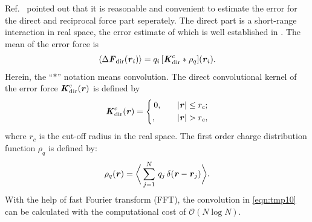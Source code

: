 \documentclass[aps,pre,preprint]{revtex4-1}
\renewcommand{\v}[1]{\textbf{\textit{#1}}}
\begin{document}
Ref.~\cite{wang2010optimizing} pointed out that it
is reasonable and convenient to estimate the error for the direct and
reciprocal force part seperately. 
The direct part is a short-range
interaction in real space, the error estimate of which
is well established in \cite{short}.
The mean of the error force is
\begin{align}\label{eqn:tmp10}
  \langle\Delta\v F_{\textrm{dir}}(\v r_i)\rangle
  =q_i\, [\v K^c_{\textrm{dir}}\ast\rho_q](\v r_i).
\end{align}
Herein, the ``$\ast$'' notation means convolution.  The direct
convolutional kernel of the error force $\v K^c_{\textrm{dir}}(\v r)$
is defined by
\begin{align}
  \v K^c_{\textrm{dir}}(\v r) =
  \left\{
    \begin{aligned}
      &\,0, &\quad & \vert\v r\vert \leq r_c;\\
      &,& & \vert\v r\vert > r_c,
    \end{aligned}
  \right.
\end{align}
where $r_c$ is the cut-off radius in the real space.  The first order
charge distribution function $\rho_q$ is defined by:
\begin{align}
  \rho_q(\v r) = 
  \bigg\langle
  \sum_{j = 1}^N
  \,q_j\,\delta(\v r - \v r_j)
  \bigg\rangle.
\end{align}
With the help of fast Fourier transform (FFT), the convolution in
\eqref{eqn:tmp10} can be calculated with the computational cost of
$\mathcal O(N\log N)$.
\end{document}
